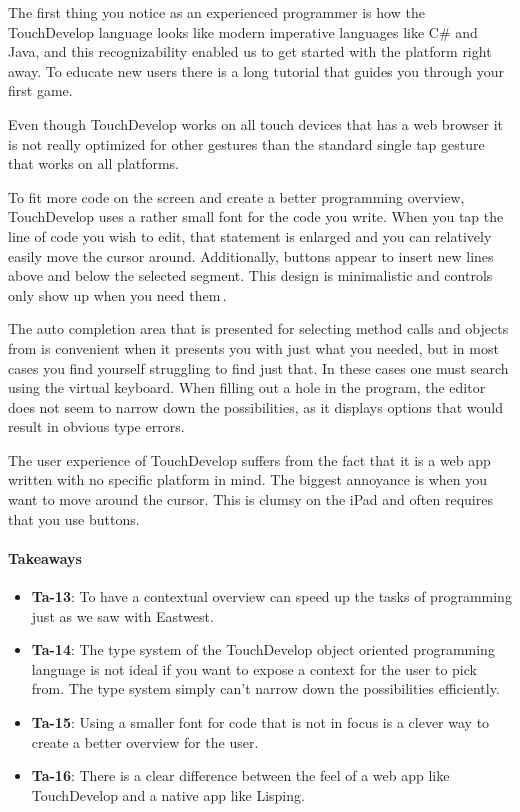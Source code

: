 The first thing you notice as an experienced programmer is how the TouchDevelop language looks like modern imperative languages like C\# and Java, and this recognizability enabled us to get started with the platform right away. 
To educate new users there is a long tutorial that guides you through your first game. 

Even though TouchDevelop works on all touch devices that has a web browser it is not really optimized for other gestures than the standard single tap gesture that works on all platforms.

To fit more code on the screen and create a better programming overview, TouchDevelop uses a rather small font for the code you write. 
When you tap the line of code you wish to edit, that statement is enlarged and you can relatively easily move the cursor around. 
Additionally, buttons appear to insert new lines above and below the selected segment. 
This design is minimalistic and controls only show up when you need them\,\cite{nielsen1990heuristic}.

The auto completion area that is presented for selecting method calls and objects from is convenient when it presents you with just what you needed, but in most cases you find yourself struggling to find just that.
In these cases one must search using the virtual keyboard.
When filling out a hole in the program, the editor does not seem to narrow down the possibilities, as it displays options that would result in obvious type errors.

The user experience of TouchDevelop suffers from the fact that it is a web app written with no specific platform in mind. The biggest annoyance is when you want to move around the cursor. This is clumsy on the iPad and often requires that you use buttons.

\paragraph{Takeaways}
\begin{itemize}
	\item \textbf{Ta-13}: To have a contextual overview can speed up the tasks of programming just as we saw with Eastwest.
	\item \textbf{Ta-14}: The type system of the TouchDevelop object oriented programming language is not ideal if you want to expose a context for the user to pick from. The type system simply can't narrow down the possibilities efficiently.
	\item \textbf{Ta-15}: Using a smaller font for code that is not in focus is a clever way to create a better overview for the user.
	\item \textbf{Ta-16}: There is a clear difference between the feel of a web app like TouchDevelop and a native app like Lisping.
\end{itemize}

